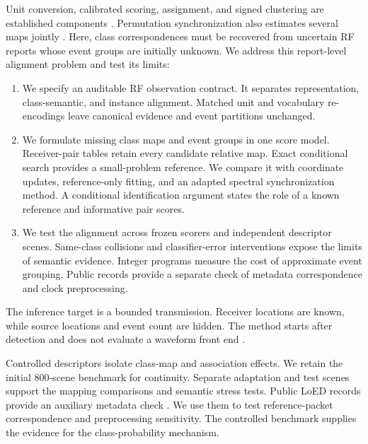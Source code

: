 Unit conversion, calibrated scoring, assignment, and signed clustering are established components \cite{guo,kuhn,bansal,baumann2025}. Permutation synchronization also estimates several maps jointly \cite{pachauri2013,chen2014}. Here, class correspondences must be recovered from uncertain RF reports whose event groups are initially unknown. We address this report-level alignment problem and test its limits:
\begin{enumerate}[leftmargin=1.5em,itemsep=2pt]
\item We specify an auditable RF observation contract. It separates representation, class-semantic, and instance alignment. Matched unit and vocabulary re-encodings leave canonical evidence and event partitions unchanged.
\item We formulate missing class maps and event groups in one score model. Receiver-pair tables retain every candidate relative map. Exact conditional search provides a small-problem reference. We compare it with coordinate updates, reference-only fitting, and an adapted spectral synchronization method. A conditional identification argument states the role of a known reference and informative pair scores.
\item We test the alignment across frozen scorers and independent descriptor scenes. Same-class collisions and classifier-error interventions expose the limits of semantic evidence. Integer programs measure the cost of approximate event grouping. Public records provide a separate check of metadata correspondence and clock preprocessing.
\end{enumerate}

The inference target is a bounded transmission. Receiver locations are known, while source locations and event count are hidden. The method starts after detection and does not evaluate a waveform front end \cite{hannotier2024,kropfreiter2024,yan2024}.

Controlled descriptors isolate class-map and association effects. We retain the initial 800-scene benchmark for continuity. Separate adaptation and test scenes support the mapping comparisons and semantic stress tests. Public LoED records provide an auxiliary metadata check \cite{loed2020,loeddataset}. We use them to test reference-packet correspondence and preprocessing sensitivity. The controlled benchmark supplies the evidence for the class-probability mechanism.
\FloatBarrier
